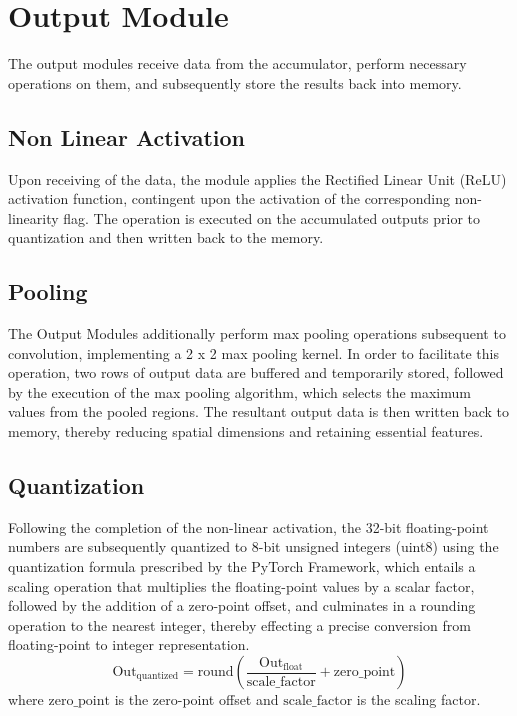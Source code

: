 \section{Output Module}
The output modules receive data from the accumulator, perform necessary operations on them, and subsequently store the results back into memory.
\subsection{Non Linear Activation}
Upon receiving of the data, the module applies the Rectified Linear Unit (ReLU) activation function, contingent upon the activation of the corresponding non-linearity flag. The operation is executed on the accumulated outputs prior to  quantization and then written back to the memory.

\subsection{Pooling}
The Output Modules additionally perform max pooling operations subsequent to convolution, implementing a 2 x 2 max pooling kernel. In order to facilitate this operation, two rows of output data are buffered and temporarily stored, followed by the execution of the max pooling algorithm, which selects the maximum values from the pooled regions. The resultant output data is then written back to memory, thereby reducing spatial dimensions and retaining essential features.

\subsection{Quantization}
Following the completion of the non-linear activation, the 32-bit floating-point numbers are subsequently quantized to 8-bit unsigned integers (uint8) using the quantization formula prescribed by the PyTorch Framework, which entails a scaling operation that multiplies the floating-point values by a scalar factor, followed by the addition of a zero-point offset, and culminates in a rounding operation to the nearest integer, thereby effecting a precise conversion from floating-point to integer representation.
\begin{equation*}
\text{Out}_{\text{quantized}} = \text{round}\left( \frac{\text{Out}_{\text{float}}}{\text{scale\_factor}} + \text{zero\_point} \right)
\end{equation*}
where \( \text{zero\_point} \) is the zero-point offset and \( \text{scale\_factor} \) is the scaling factor.

